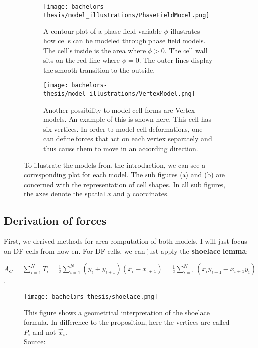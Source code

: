 \begin{figure}[b!]
	\centering
	\hfill
	\begin{subfigure}{0.4\textwidth}
		\texttt{[image: bachelors-thesis/model\_illustrations/PhaseFieldModel.png]}
		\caption{A contour plot of a phase field variable $\phi$ illustrates how cells can be modeled through phase field models. The cell's inside is the area where $\phi > 0$. The cell wall sits on the red line where $\phi = 0$. The outer lines display the smooth transition to the outside. }
	\end{subfigure}\hfill
	\begin{subfigure}{0.4\textwidth}
		\texttt{[image: bachelors-thesis/model\_illustrations/VertexModel.png]}
		\caption{Another possibility to model cell forms are Vertex models. An example of this is shown here. This cell has six vertices. In order to model cell deformations, one can define forces that act on each vertex separately and thus cause them to move in an according direction. }
	\end{subfigure}
	\caption{To illustrate the models from the introduction, we can see a corresponding plot for each model. The sub figures (a) and (b) are concerned with the representation of cell shapes. In all sub figures, the axes denote the spatial $x$ and $y$ coordinates. } 
	\label{fig:model_illus}
\end{figure}

\newpage 
\subsection*{Derivation of forces}
First, we derived methods for area computation of both models. I will just focus on DF cells from now on. 
For DF cells, we can just apply the \textbf{shoelace lemma}: 
\begin{center}
    $A_C = \sum\limits_{i = 1}^{N} T_i = \frac{1}{2} \sum\limits_{i = 1}^{N} (y_i + y_{i+1})(x_i - x_{i+1}) = \frac{1}{2}\sum\limits_{i = 1}^{N} (x_i y_{i+1} - x_{i+1} y_i) $.
\end{center} 
\begin{figure}[h!]
    \begin{center}
        \texttt{[image: bachelors-thesis/shoelace.png]}
        \caption{
            This figure shows a geometrical interpretation of the shoelace formula. In difference to the proposition, here the vertices are called $P_i$ and not $\vec{x}_i$. \\
            Source: \cite{ShoelaceFigure2022}}
        \label{fig:shoelace}
    \end{center}
\end{figure}


